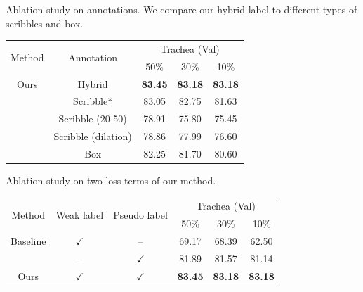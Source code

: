 \begin{table}[t!]
    \centering    
    {Ablation study on annotations. We compare our hybrid label to different types of scribbles and box.}
    \begin{tabular}[t]{c c|c c c}
        \toprule
        \multirow{2}{*}{Method} & \multirow{2}{*}{Annotation} & \multicolumn{3}{c}{Trachea (Val)} \\ %
        &                        & 50\% & 30\% & 10\%                 \\ \midrule            
        Ours &   Hybrid  & \textbf{83.45} & \textbf{83.18} & \textbf{83.18} \\
        & Scribble*      & 83.05  & 82.75 & 81.63 \\
        & Scribble (20-50)      & 78.91 & 75.80 & 75.45 \\ %
        & Scribble (dilation)      & 78.86 & 77.99 & 76.60 \\
        & Box                   & 82.25 & 81.70 & 80.60 \\
        \bottomrule 
    \end{tabular}
    \label{tab:ablate2}
\end{table}

\begin{table}[t!]
	\centering
    {Ablation study on two loss terms of our method.}
	\label{tab:ablate_loss}        
		\begin{tabular}[t]{c c c|c c c}
			\toprule
			\multirow{2}{*}{Method} & \multirow{2}{*}{Weak label} & \multirow{2}{*}{Pseudo label}  & \multicolumn{3}{c}{Trachea (Val)} \\ %
			&                       &              & 50\% & 30\% & 10\%                 \\ \midrule
			Baseline  & $\checkmark$  & --      & 69.17 & 68.39 & 62.50 \\
			& --      & $\checkmark$  & 81.89 & 81.57 & 81.14 \\
			Ours      & $\checkmark$  & $\checkmark$      & \textbf{83.45} & \textbf{83.18} & \textbf{83.18} \\
			\bottomrule 
		\end{tabular}
\end{table}

